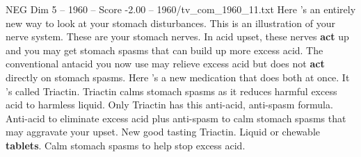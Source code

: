 \begin{textsample}{NEG Dim 5 – 1960 – Score -2.00 – 1960/tv\_com\_1960\_11.txt}  \label{ex:f5_neg_011}
Here 's an entirely new way to look at your stomach disturbances.
This is an illustration of your nerve system.
These are your stomach nerves.
In acid upset, these nerves \textbf{act} up and you may get stomach spasms that can build up more excess acid.
The conventional antacid you now use may relieve excess acid but does not \textbf{act} directly on stomach spasms.
Here 's a new medication that does both at once.
It 's called Triactin.
Triactin calms stomach spasms as it reduces harmful excess acid to harmless liquid.
Only Triactin has this anti-acid, anti-spasm formula.
Anti-acid to eliminate excess acid plus anti-spasm to calm stomach spasms that may aggravate your upset.
New good tasting Triactin.
Liquid or chewable \textbf{tablets}.
Calm stomach spasms to help stop excess acid.

\end{textsample}

